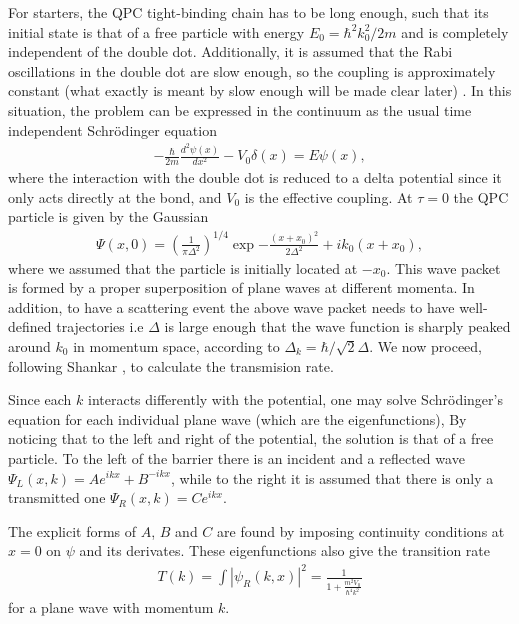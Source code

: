 \documentclass{article}
\newcommand\sj[1]{ {\color{orange} #1} }
\begin{document}
For starters, the QPC tight-binding chain has to be long enough, such that its initial 
state is that of a free particle with energy $E_0 = \hbar^2 k_0^2/2m$ and is completely 
independent of the
double dot. Additionally, it is assumed that the Rabi oscillations in the double dot are 
slow enough, so the coupling is approximately constant \sj{(what exactly is meant by slow enough will be made clear later)}. In this
situation, the problem can be expressed in the continuum as the usual time independent Schrödinger
equation 
\begin{align*}
    -\frac{\hbar}{2m} \frac{d^2 \psi (x)}{dx^2} - V_0 \delta(x) = E \psi (x),
\end{align*}
where the interaction with the double dot is reduced to a delta potential since it only acts directly at
the bond, and $V_0$ is the effective coupling. At $\tau = 0$ the QPC particle is given by the Gaussian 
\begin{align}\label{eq:gaussian_packet}
    \Psi(x,0) = \left(\frac{1}{\pi \Delta^2}\right)^{1/4} \exp{ -\frac{(x+x_0)^2}{2\Delta^2} +
     i k_0 (x+x_0)},
\end{align}
where we assumed that the particle is initially located at $-x_0$. This wave packet is formed 
by a proper superposition of plane waves at different momenta. 
In addition, to have a scattering event 
the above wave packet needs to have well-defined trajectories i.e $\Delta$ is large enough that 
the wave function is sharply
peaked around $k_0$ in momentum space, according to $\Delta_k = \hbar/\sqrt{2}\Delta$. 
We now proceed, following Shankar \cite{shankarQuantumMechanics1994}, to calculate the transmision
rate.

Since each $k$ interacts differently with the potential, one may solve Schrödinger's equation 
for each individual plane wave (which are the eigenfunctions), 
By noticing that to the left and right of the potential, the solution is that of a free particle. 
To the left of the barrier
there is an incident and a reflected wave $\Psi_{L}(x,k) = A e^{ik x} + B ^{-ikx}$, while to the right 
it is assumed that there is only a transmitted one $\Psi_{R}(x,k) = C e^{ik x}$.

The explicit forms of $A$, $B$ and $C$ are found by imposing continuity conditions at $x=0$ on $\psi$ 
and its derivates. These eigenfunctions also give the transition rate 
\begin{align}
    T(k) = \int |\psi_R (k,x)|^2 = \frac{1}{1+\frac{m^2 V_0}{\hbar^4 k^2}} 
\end{align}
for a plane wave with momentum $k$.
\end{document}
